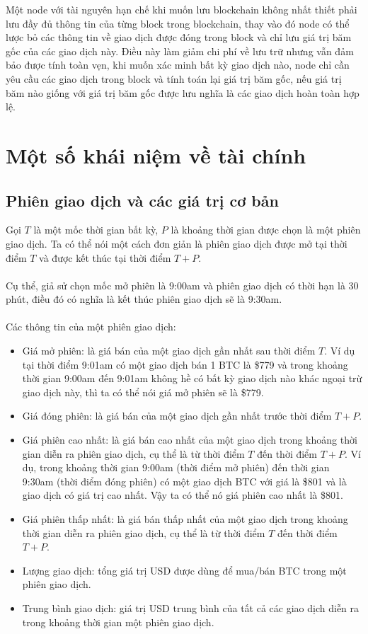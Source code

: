 Một node với tài nguyên hạn chế khi muốn lưu blockchain không nhất thiết phải 
lưu đầy đủ thông tin của từng block trong blockchain, thay vào đó node có thể 
lược bỏ các thông tin về giao dịch được đóng trong block và chỉ lưu giá trị băm 
gốc của các giao dịch này. Điều này làm giảm chi phí về lưu trữ nhưng vẫn đảm 
bảo được tính toàn vẹn, khi muốn xác minh bất kỳ giao dịch nào, node chỉ cần 
yêu cầu các giao dịch trong block và tính toán lại giá trị băm gốc, nếu giá trị 
băm nào giống với giá trị băm gốc được lưu nghĩa là các giao dịch hoàn toàn hợp 
lệ.
\section{Một số khái niệm về tài chính}
\subsection{Phiên giao dịch và các giá trị cơ bản}
Gọi $T$ là một mốc thời gian bất kỳ, $P$ là khoảng thời gian được chọn là một 
phiên giao dịch. Ta có thể nói một cách đơn giản là phiên giao dịch được mở tại 
thời điểm $T$ và được kết thúc tại thời điểm $T + P$.\\\\
Cụ thể, giả sử chọn mốc mở phiên là 9:00am và phiên giao dịch có thời hạn là 
30 phút, điều đó có nghĩa là kết thúc phiên giao dịch sẽ là 9:30am.\\\\
Các thông tin của một phiên giao dịch:
\begin{itemize}
\item Giá mở phiên: là giá bán của một giao dịch gần nhất sau thời điểm $T$. Ví 
dụ tại thời điểm 9:01am có một giao dịch bán 1 BTC là \$779 và trong khoảng thời 
gian 9:00am đến 9:01am không hề có bất kỳ giao dịch nào khác ngoại trừ giao dịch 
này, thì ta có thể nói giá mở phiên sẽ là \$779.
\item Giá đóng phiên: là giá bán của một giao dịch gần nhất trước thời điểm 
$T + P$.
\item Giá phiên cao nhất: là giá bán cao nhất của một giao dịch trong khoảng 
thời gian diễn ra phiên giao dịch, cụ thể là từ thời điểm $T$ đến thời điểm 
$T + P$. Ví dụ, trong khoảng thời gian 9:00am (thời điểm mở phiên) đến thời gian 
9:30am (thời điểm đóng phiên) có một giao dịch BTC với giá là \$801 và là giao 
dịch có giá trị cao nhất. Vậy ta có thể nó giá phiên cao nhất là \$801.
\item Giá phiên thấp nhất: là giá bán thấp nhất của một giao dịch trong khoảng 
thời gian diễn ra phiên giao dịch, cụ thể là từ thời điểm $T$ đến thời điểm $T + P$.
\item Lượng giao dịch: tổng giá trị USD được dùng để  mua/bán BTC trong một phiên 
giao dịch.
\item Trung bình giao dịch: giá trị USD trung bình của tất cả các giao dịch diễn 
ra trong khoảng thời gian một phiên giao dịch.
\end{itemize}
